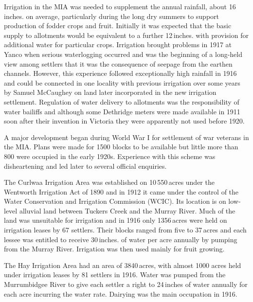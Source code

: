 Irrigation in the MIA was needed to supplement the annual rainfall,
about 16\,inches. on average, particularly during the long dry summers
to support production of fodder crops and fruit.  Initially it was
expected that the basic supply to allotments would be equivalent to a
further 12\,inches. with provision for additional water for particular
crops. Irrigation brought problems in 1917 at Yanco when serious
waterlogging  occurred and was the beginning of a
long-held view among settlers that it was the consequence of seepage
from the earthen channels.  However, this experience followed
exceptionally high rainfall in 1916 and could be connected in one
locality with previous irrigation over some years by Samuel McCaughey
on land later incorporated in the new irrigation settlement.
Regulation of water delivery to allotments was the responsibility of
water bailiffs and although some Dethridge meters
 were made available
in 1911 soon after their invention in Victoria they were apparently
not used before 1920.

A major development began during World War I for settlement of war
veterans in the MIA.  Plans were made for 1500 blocks to be available
but little more than 800 were occupied in the early 1920s.  Experience
with this scheme was disheartening and led later to several official
enquiries.

The Curlwaa Irrigation Area  was
established on 10\,550\,acres under the Wentworth Irrigation Act of
1890 and in 1912 it came under the control of the Water Conservation
and Irrigation Commission (WCIC).  Its location is on
low-level alluvial land between Tuckers Creek 
and the Murray River. Much of the land was unsuitable for irrigation
and in 1916 only 1356\,acres were held on irrigation leases by 67
settlers.  Their blocks ranged from five to 37\,acres and each lessee
was entitled to receive 30\,inches. of water per acre annually by
pumping from the Murray River.  Irrigation was then used mainly for
fruit growing.

The Hay Irrigation Area  had an area of
3840\,acres, with almost 1000 acres held under irrigation leases by 81
settlers in 1916. Water was pumped from the Murrumbidgee River to give
each settler a right to 24\,inches of water annually for each acre
incurring the water rate.  Dairying was the main occupation in
1916.

